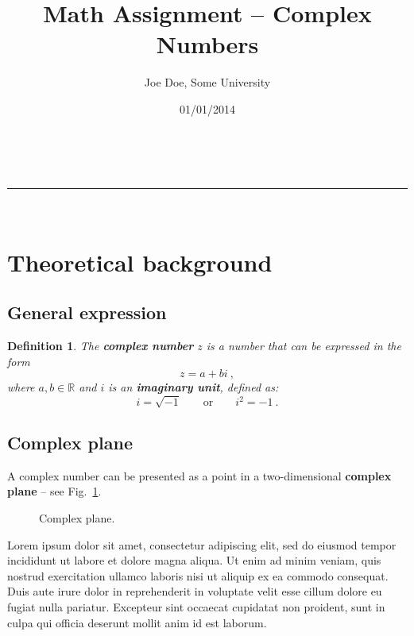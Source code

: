 \documentclass[a4paper,11pt]{article}
\makeatletter
\newcommand{\linia}{\rule{\linewidth}{0.5pt}}
\theoremstyle{mytheor}
\newtheorem{defi}{Definition}
\renewcommand{\maketitle}{
\begin{center}
\vspace{2ex}
{\huge \textsc{\@title}}
\vspace{1ex}
\\
\linia\\
\@author \hfill \@date
\vspace{4ex}
\end{center}
}
\makeatother
\begin{document}
\title{Math Assignment -- Complex Numbers}

\author{Joe Doe, Some University}

\date{01/01/2014}

\maketitle

\section{Theoretical background}

\subsection{General expression}

\begin{defi}
The \textbf{complex number} $z$ is a number that can be expressed in the form
\begin{equation}
z = a + bi\ ,
\label{r1}
\end{equation}
where $a, b \in \mathbb{R}$ and $i$ is an \textbf{imaginary unit}, defined as:
$$i=\sqrt{-1} \qquad \text{or} \qquad i^2= -1\ .$$ 
\end{defi}

\subsection{Complex plane}

A complex number can be presented as a point in a two-dimensional \textbf{complex plane} -- see Fig.~\ref{fig:cmpl}.


\begin{figure}[!htb]
\centering
{}
\caption{\label{fig:cmpl}Complex plane.}
\end{figure}

Lorem ipsum dolor sit amet, consectetur adipiscing elit, sed do eiusmod tempor incididunt ut labore et dolore magna aliqua. Ut enim ad minim veniam, quis nostrud exercitation ullamco laboris nisi ut aliquip ex ea commodo consequat. Duis aute irure dolor in reprehenderit in voluptate velit esse cillum dolore eu fugiat nulla pariatur. Excepteur sint occaecat cupidatat non proident, sunt in culpa qui officia deserunt mollit anim id est laborum.
\end{document}
